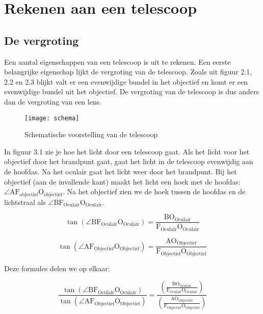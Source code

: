 \section{Rekenen aan een telescoop}


\subsection{De vergroting}

Een aantal eigenschappen van een telescoop is uit te rekenen. Een
eerste belangrijke eigenschap lijkt de vergroting van de telescoop.
Zoals uit figuur 2.1, 2.2 en 2.3 blijkt valt er een evenwijdige bundel
in het objectief en komt er een evenwijdige bundel uit het objectief.
De vergroting van de telescoop is dus anders dan de vergroting van
een lens. 

\begin{figure}[H]
\noindent \begin{centering}
\texttt{[image: schema]}
\par\end{centering}

\caption{Schematische voorstelling van de telescoop}
\end{figure}


In figuur 3.1 zie je hoe het licht door een telescoop gaat. Als het
licht voor het objectief door het brandpunt gaat, gaat het licht in
de telescoop evenwijdig aan de hoofdas. Na het oculair gaat het licht
weer door het brandpunt. Bij het objectief (aan de invallende kant)
maakt het licht een hoek met de hoofdas: $\angle\mathrm{A}\mathrm{F_{objectief}O_{objectief}}$.
Na het objectief zien we de hoek tussen de hoofdas en de lichtstraal
als $\angle\mathrm{BF_{Oculair}O_{Oculair}}$.

\begin{equation}
\tan(\angle\mathrm{B}\mathrm{F_{Oculair}O_{Oculair}})
=\frac{\mathrm{B}\mathrm{O_{Oculair}}}{\mathrm{F_{Oculair}O_{Oculair}}}
\end{equation}


\begin{equation}
\tan(\angle\mathrm{A}\mathrm{F_{Objectief}O_{Objectief}})
=\frac{\mathrm{A}\mathrm{O_{Objectief}}}{\mathrm{F_{Objectief}O_{Objectief}}}
\end{equation}


Deze formules delen we op elkaar:

\begin{equation}
\frac{\tan(\angle\mathrm{B}\mathrm{F_{Oculair}O_{Oculair}})}{\tan(\angle\mathrm{A}\mathrm{F_{Objectief}O_{Objectief}})}
=\frac{\left(\frac{\mathrm{B}\mathrm{O_{Oculair}}}{\mathrm{F_{Oculair}O_{Oculair}}}\right)}{\left(\frac{\mathrm{A}\mathrm{O_{Objectief}}}{\mathrm{F_{Objectief}O_{Objectief}}}\right)}
\end{equation}


